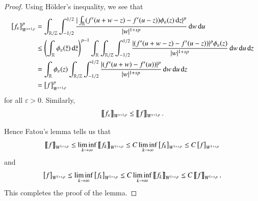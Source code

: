 \begin{proof}
Using H\"older's inequality, we see that
\begin{align*}
 \left[f_\varepsilon\right]_{W^{s+1,p}}^p
     &=  \int_{\mathbb R / \mathbb Z} \int_{-1/2}^{1/2} \frac{|\int_{\mathbb R}(f'(u+w-z)-f'(u-z))  \phi_\varepsilon(z)\,\mathrm{d} z|^p}{|w|^{1+sp}} \,\mathrm{d} w\,\mathrm{d} u
  \\ &\leq \left(\int_{\mathbb{R}}\phi_{\varepsilon}(\tilde z)\,\mathrm{d}\tilde z\right)^{p-1}\int_{\mathbb R}\int_{\mathbb R / \mathbb Z} \int_{-1/2}^{1/2} \frac{|(f'(u+w-z)-f'(u-z)) |^p\phi_\varepsilon(z)}{|w|^{1+sp}} \,\mathrm{d} w\,\mathrm{d} u\,\mathrm{d} z
  \\ & = \int_{\mathbb R}\phi_{\varepsilon}( z)\int_{\mathbb R / \mathbb Z} \int_{-1/2}^{1/2} \frac{|(f'(u+w)-f'(u)) |^p}{|w|^{1+sp}} \,\mathrm{d} w\,\mathrm{d} u \,\mathrm{d} z
  \\ & =\left[f\right] _{W^{s+1,p}} ^{p}
\end{align*}
for all $\varepsilon >0$. Similarly,
$$
  \left\llbracket f_\varepsilon\right\rrbracket _{W^{s+1,p}}
  \leq\left\llbracket f\right\rrbracket_{W^{s+1,p}}.
$$

Hence Fatou's lemma tells us that
\begin{equation*}
 \left\llbracket f\right\rrbracket_{W^{1+s,p}} \leq \liminf_{k \rightarrow \infty} \left\llbracket f_k\right\rrbracket_{W^{1+s,p}} \leq C \liminf_{k \to\infty} \left[f_k\right]_{W^{1+s,p}}
 \leq C\left[f\right]_{W^{1+s,p}}
\end{equation*}
and
\begin{equation*}
 \left[f\right]_{W^{1+s,p}} \leq \liminf_{k \rightarrow \infty}
 \left[f_k\right]_{W^{1+s,p}} \leq C \liminf_{k \to \infty} \left\llbracket f_k\right\rrbracket_{W^{1+s,p}} 
 \leq C\left\llbracket f\right\rrbracket_{W^{1+s,p}} .
\end{equation*}
This completes the proof of the lemma.
\end{proof}
